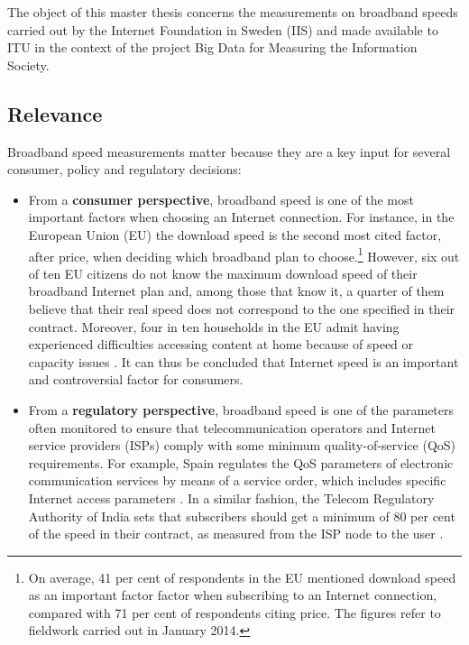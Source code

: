 \documentclass[12pt]{article}
\begin{document}
The object of this master thesis concerns the measurements on broadband speeds carried out by the Internet Foundation in Sweden (IIS) and made available to ITU in the context of the project Big Data for Measuring the Information Society.    

\subsection{Relevance}
Broadband speed measurements matter because they are a key input for several consumer, policy and regulatory decisions:

\begin{itemize}

	\item From a \textbf{consumer perspective}, broadband speed is one of the most important factors when choosing an Internet connection. For instance, in the European Union (EU) the download speed is the second most cited factor, after price, when deciding which broadband plan to choose.\footnote{On average, 41 per cent of respondents in the EU mentioned download speed as an important factor factor when subscribing to an Internet connection, compared with 71 per cent of respondents citing price. The figures refer to fieldwork carried out in January 2014.} However, six out of ten EU citizens do not know the maximum download speed of their broadband Internet plan and, among those that know it, a quarter of them believe that their real speed does not correspond to the one specified in their contract. Moreover, four in ten households in the EU admit having experienced difficulties accessing content at home because of speed or capacity issues \citep{eurobarometer}. It can thus be concluded that Internet speed is an important and controversial factor for consumers. 
	
	\item From a \textbf{regulatory perspective}, broadband speed is one of the parameters often monitored to ensure that telecommunication operators and Internet service providers (ISPs) comply with some minimum quality-of-service (QoS) requirements. For example, Spain regulates the QoS parameters of electronic communication services by means of a service order, which includes specific Internet access parameters \citep[Annex I, Part II in ][]{boe}. In a similar fashion, the Telecom Regulatory Authority of India sets that subscribers should get a minimum of 80 per cent of the speed in their contract, as measured from the ISP node to the user \citep{trai2006}.         
	

\end{itemize}
\end{document}
